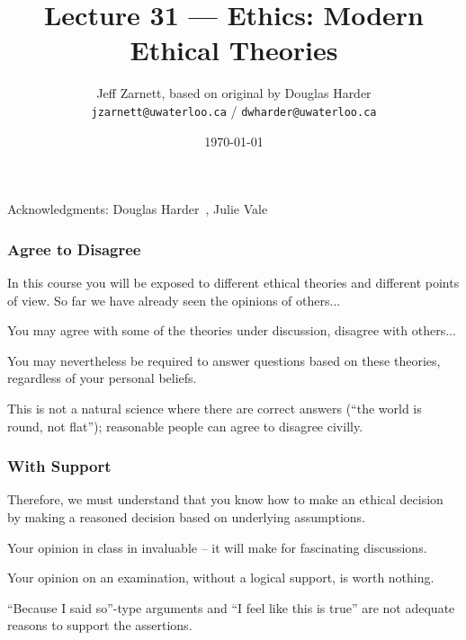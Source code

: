 

\title{Lecture 31 --- Ethics: Modern Ethical Theories }

\author{Jeff Zarnett, based on original by Douglas Harder \\ \small \texttt{jzarnett@uwaterloo.ca} / \texttt{dwharder@uwaterloo.ca}}
\date{\today}




\begin{frame}
  \titlepage

\begin{center}
  \small{Acknowledgments: Douglas Harder~\cite{dwh}, Julie Vale~\cite{jv}}
  \end{center}
\end{frame}



\begin{frame}
\frametitle{Agree to Disagree}

In this course you will be exposed to different ethical theories and different points of view. So far we have already seen the opinions of others...

You may agree with some of the theories under discussion, disagree with others...

You may nevertheless be required to answer questions based on these theories, regardless of your personal beliefs. 

This is not a natural science where there are correct answers (``the world is round, not flat''); reasonable people can agree to disagree civilly.


\end{frame}



\begin{frame}
\frametitle{With Support}

Therefore, we must understand that you know how to make an ethical decision by making a reasoned decision based on underlying assumptions.

Your opinion in class in invaluable -- it will make for fascinating discussions.


Your opinion on an examination, without a logical support, is worth nothing.

``Because I said so''-type arguments and ``I feel like this is true'' are not adequate reasons to support the assertions.

\end{frame}



